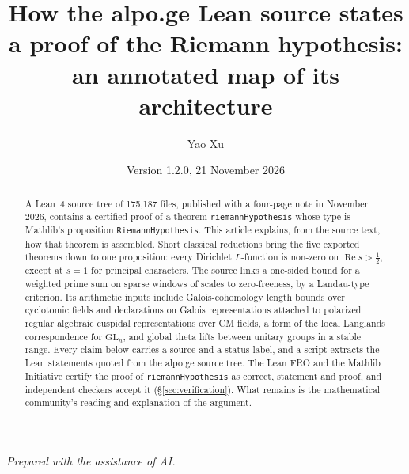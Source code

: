 \documentclass[11pt]{article}
\title{How the alpo.ge Lean source states a proof of the Riemann hypothesis:\\
an annotated map of its architecture}
\author{Yao Xu}
\date{Version 1.2.0, 21 November 2026}
\newcommand{\lean}[1]{\nolinkurl{#1}}                 %
\newcommand{\mathlib}[1]{\nolinkurl{#1}}              %
\theoremstyle{definition}
\theoremstyle{remark}
\begin{document}
\maketitle

\begin{abstract}
A Lean~4 source tree of 175{,}187 files, published with a four-page note in November 2026,
contains a certified proof of a theorem \lean{riemannHypothesis} whose type is Mathlib's proposition
\mathlib{RiemannHypothesis}. This article explains, from the source text, how that theorem is
assembled. Short classical reductions bring the five exported theorems down to one proposition:
every Dirichlet $L$-function is non-zero on $\operatorname{Re}s>\tfrac12$, except at $s=1$ for
principal characters. The source links a one-sided bound for a weighted prime sum on sparse windows
of scales to zero-freeness, by a Landau-type criterion. Its arithmetic inputs include
Galois-cohomology length bounds over cyclotomic fields and declarations on Galois representations
attached to polarized regular algebraic cuspidal representations over CM fields, a form of the
local Langlands correspondence for $\mathrm{GL}_n$, and global theta lifts between unitary groups in
a stable range. Every claim below carries a source and a
status label, and a script extracts the Lean statements quoted from the alpo.ge source tree. The
Lean FRO and the Mathlib Initiative certify the proof of \lean{riemannHypothesis} as correct,
statement and proof, and independent checkers accept it (\S\ref{sec:verification}). What remains
is the mathematical community's reading and explanation of the argument.
\end{abstract}

\tableofcontents













\appendix





\bigskip
\noindent\emph{Prepared with the assistance of AI.}
\end{document}
